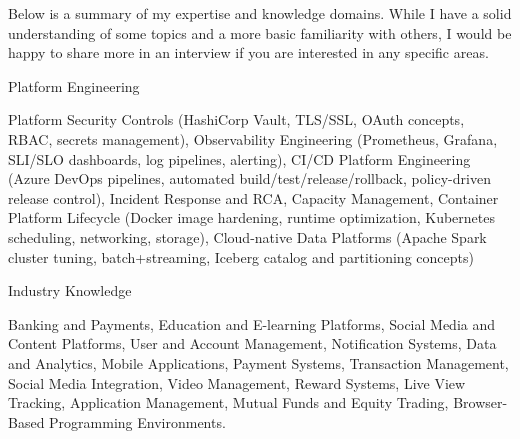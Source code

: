 
\begin{cvparagraph}
  Below is a summary of my expertise and knowledge domains. While I have a solid understanding of some topics and a more basic familiarity with others, I would be happy to share more in an interview if you are interested in any specific areas.
\end{cvparagraph}

\begin{cventries}

  \cventry
    {Platform Engineering} %
    {} %
    {} %
    {} %
    {
      \begin{cvitems}
        \item {Platform Security Controls (HashiCorp Vault, TLS/SSL, OAuth concepts, RBAC, secrets management), Observability Engineering (Prometheus, Grafana, SLI/SLO dashboards, log pipelines, alerting), CI/CD Platform Engineering (Azure DevOps pipelines, automated build/test/release/rollback, policy-driven release control), Incident Response and RCA, Capacity Management, Container Platform Lifecycle (Docker image hardening, runtime optimization, Kubernetes scheduling, networking, storage), Cloud-native Data Platforms (Apache Spark cluster tuning, batch+streaming, Iceberg catalog and partitioning concepts)}
      \end{cvitems}
    }

  \cventry
    {Industry Knowledge} %
    {} %
    {} %
    {} %
    {
      \begin{cvitems}
        \item {Banking and Payments, Education and E-learning Platforms, Social Media and Content Platforms, User and Account Management, Notification Systems, Data and Analytics, Mobile Applications, Payment Systems, Transaction Management, Social Media Integration, Video Management, Reward Systems, Live View Tracking, Application Management, Mutual Funds and Equity Trading, Browser-Based Programming Environments.}
      \end{cvitems}
    }


\end{cventries}
